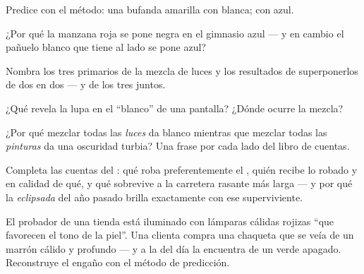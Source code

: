 \begin{exercise}[$\star$]\label{exo:g8:colors-spectra:5}
Predice con el método: una bufanda amarilla con  blanca; con
 azul.
\end{exercise}

\begin{exercise}[$\star$]\label{exo:g8:colors-spectra:6}
¿Por qué la manzana roja se pone negra en el gimnasio azul --- y en
cambio el pañuelo blanco que tiene al lado se pone azul?
\end{exercise}

\begin{exercise}[$\star$]\label{exo:g8:colors-spectra:7}
Nombra los tres primarios de la mezcla de luces y los resultados de
superponerlos de dos en dos --- y de los tres juntos.
\end{exercise}

\begin{exercise}[$\star$]\label{exo:g8:colors-spectra:8}
¿Qué revela la lupa en el ``blanco'' de una pantalla? ¿Dónde ocurre la
mezcla?
\end{exercise}

\begin{exercise}[$\star\star$]\label{exo:g8:colors-spectra:9}
¿Por qué mezclar todas las \emph{luces} da blanco mientras que
mezclar todas las \emph{pinturas} da una oscuridad turbia? Una frase
por cada lado del libro de cuentas.
\end{exercise}

\begin{exercise}[$\star\star$]\label{exo:g8:colors-spectra:10}
Completa las cuentas del : qué roba preferentemente el
, quién recibe lo robado y en calidad de qué, y qué sobrevive a
la carretera rasante más larga --- y por qué la \emph{
eclipsada} del año pasado brilla exactamente con ese superviviente.
\end{exercise}

\begin{exercise}[$\star\star$]\label{exo:g8:colors-spectra:11}
El probador de una tienda está iluminado con lámparas cálidas rojizas
``que favorecen el tono de la piel''. Una clienta compra una chaqueta
que se veía de un marrón cálido y profundo --- y a la  del día la
encuentra de un verde apagado. Reconstruye el engaño con el método de
predicción.
\end{exercise}


